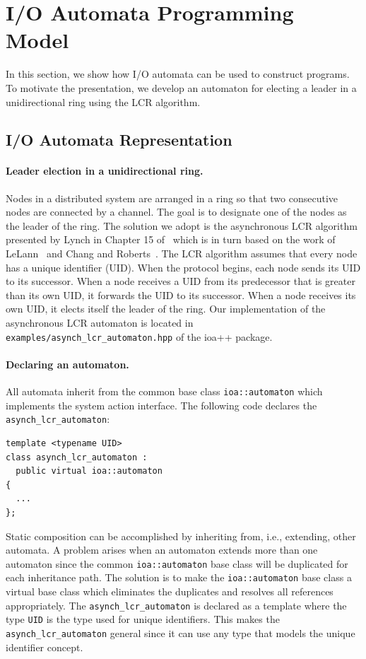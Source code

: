 \section{I/O Automata Programming Model\label{representation}}

In this section, we show how I/O automata can be used to construct programs.
To motivate the presentation, we develop an automaton for electing a leader in a unidirectional ring using the LCR algorithm.

\subsection{I/O Automata Representation}

\paragraph{Leader election in a unidirectional ring.}
Nodes in a distributed system are arranged in a ring so that two consecutive nodes are connected by a channel.
The goal is to designate one of the nodes as the leader of the ring.
The solution we adopt is the asynchronous LCR algorithm presented by Lynch in Chapter 15 of~\cite{lynch1996distributed} which is in turn based on the work of LeLann~\cite{le1977distributed} and Chang and Roberts~\cite{chang1979improved}.
The LCR algorithm assumes that every node has a unique identifier (UID).
When the protocol begins, each node sends its UID to its successor.
When a node receives a UID from its predecessor that is greater than its own UID, it forwards the UID to its successor.
When a node receives its own UID, it elects itself the leader of the ring.
Our implementation of the asynchronous LCR automaton is located in \verb+examples/asynch_lcr_automaton.hpp+ of the ioa++ package.

\paragraph{Declaring an automaton.}
All automata inherit from the common base class \verb+ioa::automaton+ which implements the system action interface.
The following code declares the \verb+asynch_lcr_automaton+:
\begin{lstlisting}
template <typename UID>
class asynch_lcr_automaton :
  public virtual ioa::automaton
{
  ...
};
\end{lstlisting}
Static composition can be accomplished by inheriting from, i.e., extending, other automata.
A problem arises when an automaton extends more than one automaton since the common \verb+ioa::automaton+ base class will be duplicated for each inheritance path.
The solution is to make the \verb+ioa::automaton+ base class a virtual base class which eliminates the duplicates and resolves all references appropriately.
The \verb+asynch_lcr_automaton+ is declared as a template where the type \verb+UID+ is the type used for unique identifiers.
This makes the \verb+asynch_lcr_automaton+ general since it can use any type that models the unique identifier concept.

